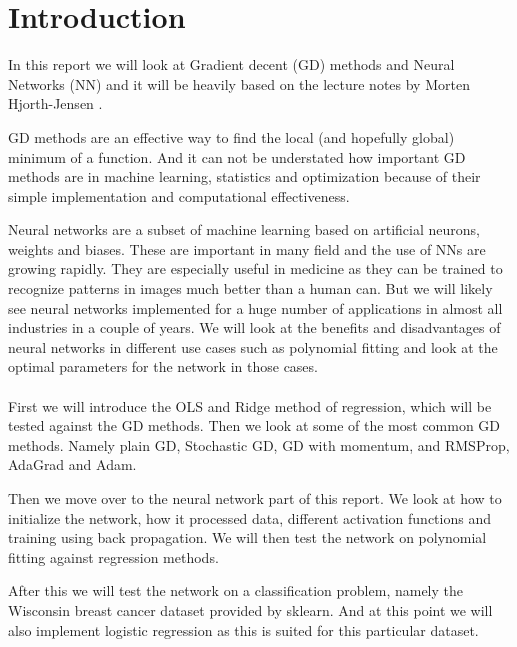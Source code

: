 \section{Introduction}


\begin{comment}
    In this report we will look at ...
    Motivate the reader, the first part of the introduction gives always a
    motivation and tries to give the overarching ideas. What I have done. 
    The structure of the report, how it is organised. Explain structure of the rapport at the end of intro. 
\end{comment}

In this report we will look at Gradient decent (GD) methods and Neural Networks
(NN) and it will be heavily based on the lecture notes by Morten Hjorth-Jensen
\cite{w41}.

GD methods are an effective way to find the local (and hopefully global)
minimum of a function. And it can not be understated how important GD methods
are in machine learning, statistics and optimization because of their simple
implementation and computational effectiveness.

Neural networks are a subset of machine learning based on artificial neurons,
weights and biases. These are important in many field and the use of NNs
are growing rapidly. They are especially useful in medicine as they can be
trained to recognize patterns in images much better than a human can. But we
will likely see neural networks implemented for a huge number of applications
in almost all industries in a couple of years. We will look at the benefits and
disadvantages of neural networks in different use cases such as polynomial
fitting and look at the optimal parameters for the network in those cases.
\\~\\
First we will introduce the OLS and Ridge method of regression, which will be
tested against the GD methods. Then we look at some of the most common GD methods. Namely plain
GD, Stochastic GD, GD with momentum, and RMSProp, AdaGrad and Adam. 

Then we move over to the neural network part of this report. We look at how to
initialize the network, how it processed data, different activation functions and
training using back propagation. We will then test the network on polynomial
fitting against regression methods.

After this we will test the network on a classification problem, namely
the Wisconsin breast cancer dataset provided by sklearn. And at this point we
will also implement logistic regression as this is suited for this particular
dataset. 
